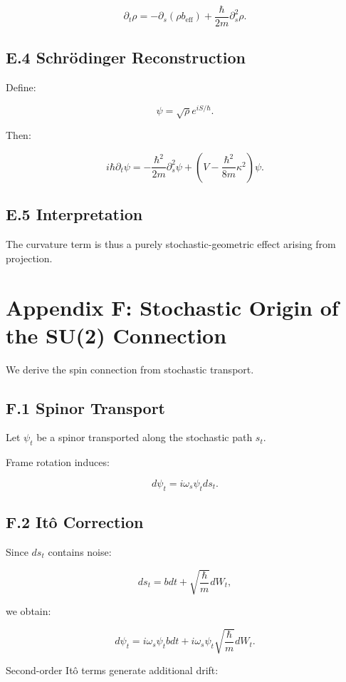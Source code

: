 \documentclass[11pt]{article}
\begin{document}
\[
\partial_t \rho = -\partial_s(\rho b_{\mathrm{eff}})
+ \frac{\hbar}{2m}\partial_s^2 \rho.
\]

\subsection*{E.4 Schr\"odinger Reconstruction}

Define:

\[
\psi = \sqrt{\rho} e^{iS/\hbar}.
\]

Then:

\[
i\hbar \partial_t \psi =
-\frac{\hbar^2}{2m}\partial_s^2 \psi
+ \left(V - \frac{\hbar^2}{8m}\kappa^2\right)\psi.
\]

\subsection*{E.5 Interpretation}

The curvature term is thus a purely stochastic-geometric effect arising from projection.



\section*{Appendix F: Stochastic Origin of the SU(2) Connection}

We derive the spin connection from stochastic transport.

\subsection*{F.1 Spinor Transport}

Let $\psi_t$ be a spinor transported along the stochastic path $s_t$.

Frame rotation induces:

\[
d\psi_t = i \omega_s \psi_t ds_t.
\]

\subsection*{F.2 It\^o Correction}

Since $ds_t$ contains noise:

\[
ds_t = b dt + \sqrt{\frac{\hbar}{m}} dW_t,
\]

we obtain:

\[
d\psi_t = i \omega_s \psi_t b dt
+ i \omega_s \psi_t \sqrt{\frac{\hbar}{m}} dW_t.
\]

Second-order It\^o terms generate additional drift:
\end{document}
